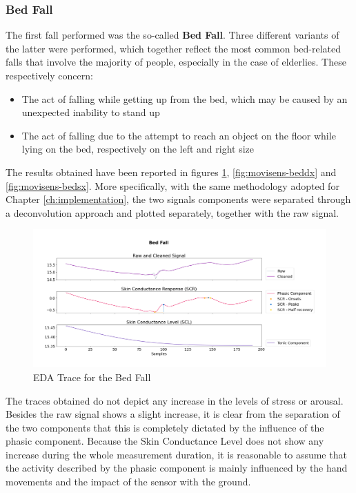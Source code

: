 \subsubsection{Bed Fall}\label{subsubsec:bed-fall}

The first fall performed was the so-called \textbf{Bed Fall}. Three different variants of the latter were performed, which together reflect the most common bed-related falls that involve the majority of people, especially in the case of elderlies. These respectively concern: 

\begin{itemize}
    \item The act of falling while getting up from the bed, which may be caused by an unexpected inability to stand up 
    \item The act of falling due to the attempt to reach an object on the floor while lying on the bed, respectively on the left and right size
\end{itemize}

The results obtained have been reported in figures \ref{fig:movisens-bed}, \ref{fig:movisens-beddx} and \ref{fig:movisens-bedsx}. More specifically, with the same methodology adopted for Chapter \ref{ch:implementation}, the two signals components were separated through a deconvolution approach and plotted separately, together with the raw signal.

\begin{figure}[h!]
    \centering
    \includegraphics[width=\textwidth]{./images/movisens/Bed.png}
    \caption{EDA Trace for the Bed Fall}
    \label{fig:movisens-bed}
\end{figure}

The traces obtained do not depict any increase in the levels of stress or arousal. Besides the raw signal shows a slight increase, it is clear from the separation of the two components that this is completely dictated by the influence of the phasic component. Because the Skin Conductance Level does not show any increase during the whole measurement duration, it is reasonable to assume that the activity described by the phasic component is mainly influenced by the hand movements and the impact of the sensor with the ground.

